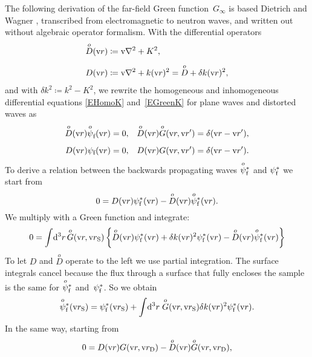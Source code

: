\def\Do{\overset{o}{D}}
\def\Go{\overset{o}{G}}
\def\pfo{\overset{o}{\psi}_\sf}
\def\pfoc{\overset{o}{\psi}\vphantom{\psi}^*_\sf}

The following derivation of the far-field Green function~$G_\infty$
%
is based Dietrich and Wagner \cite{DiWa84,DiWa16},
transcribed from electromagnetic to neutron waves,
and written out without algebraic operator formalism.
With the differential operators
\begin{align}
    \Do(\r) &\coloneqq \Nabla^2+K^2, \label{EDDefVac} \\[1.2ex]
    D(\r) &\coloneqq \Nabla^2+k(\r)^2 = \Do + \delta k(\r)^2, \label{EDDefFul}
\end{align}
and with $\delta k^2\coloneqq k^2-K^2$,
we rewrite the homogeneous and inhomogeneous differential equations \cref{EHomoK}
and~\cref{EGreenK} for plane waves and distorted waves as
\begin{align}\label{EHIDG}
    \Do(\r)\pfo  (\r) = 0, &\quad \Do(\r)\Go(\r,\r') = \delta(\r-\r'), \\[1.2ex]
    D(\r)\psi_\sf(\r) = 0, &\quad D(\r)  G  (\r,\r') = \delta(\r-\r').
\end{align}
To derive a relation between the backwards propagating waves $\pfoc$ and $\psi^*_\sf$ we start from%
\begin{equation}
  0 = D(\r)\psi^*_\sf(\r) - \Do(\r)\pfoc(\r).
\end{equation}
We multiply with a Green function and integrate:
\begin{equation}
  0 = \int\!\d^3r\,\Go(\r,\rS)
         \left\{\Do(\r)\psi^*_\sf(\r) + \delta k(\r)^2\psi^*_\sf(\r)- \Do(\r)\pfoc(\r)\right\}
\end{equation}
To let $D$ and $\Do$ operate to the left
we use partial integration.
The surface integrals cancel because the flux through a surface that fully encloses the sample
is the same for $\pfoc$ and~$\psi^*_\sf$.
So we obtain
\begin{equation}\label{EPsiPfo1}
  \pfoc(\rS) = \psi^*_\sf(\rS) + \int\!\d^3r\;\Go(\r,\rS)\delta k(\r)^2\psi^*_\sf(\r).
\end{equation}
In the same way, starting from
\begin{equation}
  0 = D(\r)G(\r,\rD) - \Do(\r)\Go(\r,\rD),
\end{equation}
